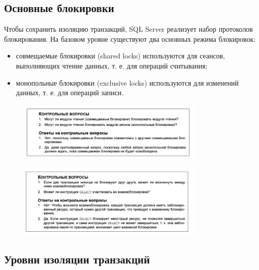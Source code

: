 \subsection{Основные блокировки}

Чтобы сохранить изоляцию транзакций, SQL Server реализует набор протоколов
блокирования. На базовом уровне существуют два основных режима блокировок: 

\begin{itemize}
	\item совмещаемые блокировки (shared locks) используются для сеансов, выполняющих чтение данных, т. е. для операций считывания;
	\item монопольные блокировки (exclusive locks) используются для изменений данных,
	т. е. для операций записи. 
\end{itemize}

\begin{figure}[h!]
	\begin{center}
		\includegraphics[width=0.8\textwidth]{img/control30.png}
	\end{center}
	\captionsetup{justification=centering}
\end{figure}


\begin{figure}[h!]
	\begin{center}
		\includegraphics[width=0.8\textwidth]{img/control31.png}
	\end{center}
	\captionsetup{justification=centering}
\end{figure}

\subsection{Уровни изоляции транзакций}


